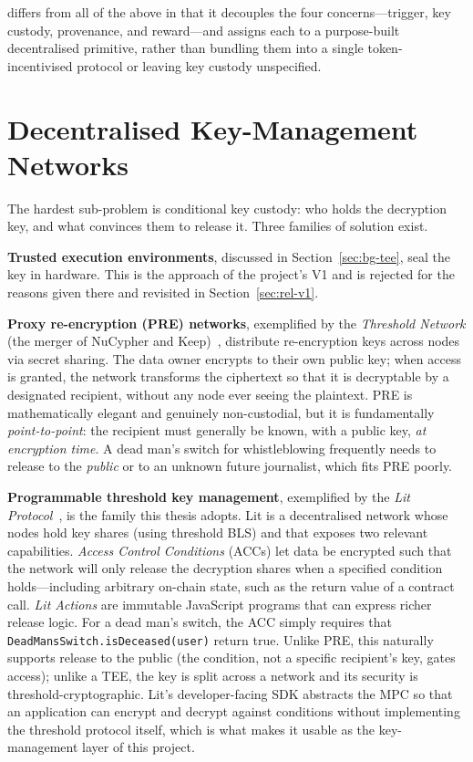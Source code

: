\zkw differs from all of the above in that it decouples the four concerns---trigger,
key custody, provenance, and reward---and assigns each to a purpose-built
decentralised primitive, rather than bundling them into a single token-incentivised
protocol or leaving key custody unspecified.

\section{Decentralised Key-Management Networks}
\label{sec:rel-keymgmt}

The hardest sub-problem is conditional key custody: who holds the decryption key,
and what convinces them to release it. Three families of solution exist.

\textbf{Trusted execution environments}, discussed in Section~\ref{sec:bg-tee},
seal the key in hardware. This is the approach of the project's V1 and is rejected
for the reasons given there and revisited in Section~\ref{sec:rel-v1}.

\textbf{Proxy re-encryption (PRE) networks}, exemplified by the \emph{Threshold
Network} (the merger of NuCypher and Keep)~\cite{thresholdNetwork, nucypher},
distribute re-encryption keys across nodes via secret sharing. The data owner
encrypts to their own public key; when access is granted, the network transforms
the ciphertext so that it is decryptable by a designated recipient, without any
node ever seeing the plaintext. PRE is mathematically elegant and genuinely
non-custodial, but it is fundamentally \emph{point-to-point}: the recipient must
generally be known, with a public key, \emph{at encryption time}. A dead man's
switch for whistleblowing frequently needs to release to the \emph{public} or to
an unknown future journalist, which fits PRE poorly.

\textbf{Programmable threshold key management}, exemplified by the \emph{Lit
Protocol}~\cite{litprotocol}, is the family this thesis adopts. Lit is a
decentralised network whose nodes hold key shares (using threshold BLS) and that
exposes two relevant capabilities. \emph{Access Control Conditions} (ACCs) let
data be encrypted such that the network will only release the decryption shares
when a specified condition holds---including arbitrary on-chain state, such as
the return value of a contract call. \emph{Lit Actions} are immutable JavaScript
programs that can express richer release logic. For a dead man's switch, the ACC
simply requires that \texttt{DeadMansSwitch.isDeceased(user)} return true. Unlike
PRE, this naturally supports release to the public (the condition, not a specific
recipient's key, gates access); unlike a TEE, the key is split across a network
and its security is threshold-cryptographic. Lit's developer-facing SDK abstracts
the MPC so that an application can encrypt and decrypt against conditions without
implementing the threshold protocol itself, which is what makes it usable as the
key-management layer of this project.

